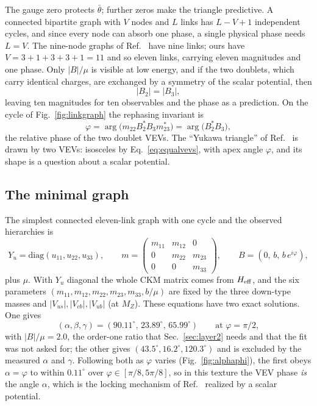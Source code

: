 \documentclass[submission, Phys]{SciPost}
\newcommand{\bt}{\bar\theta}
\begin{document}
The gauge zero protects $\bt$; further zeros make the triangle
predictive. A connected bipartite graph with $V$ nodes and $L$ links
has $L-V+1$ independent cycles, and since every node can absorb one
phase, a single physical phase needs $L=V$. The nine-node graphs of
Ref.~\cite{Arkani-Hamed:2026uos} have nine links; ours have
$V=3+1+3+3+1=11$ and so eleven links, carrying eleven magnitudes and
one phase. Only $|B|/\mu$ is visible at low energy, and if the two
doublets, which carry identical charges, are exchanged by a symmetry
of the scalar potential, then
\begin{equation}
  |B_2|=|B_3|,
  \label{eq:equalvevs}
\end{equation}
leaving ten magnitudes for ten observables and the phase as a
prediction. On the cycle of Fig.~\ref{fig:linkgraph} the rephasing
invariant is
\begin{equation}
  \varphi=\arg\!\big(m_{22}B_2^{*}B_3m_{23}^{*}\big)=\arg\!\big(B_2^{*}B_3\big),
  \label{eq:phivev}
\end{equation}
the relative phase of the two doublet VEVs. The ``Yukawa triangle'' of
Ref.~\cite{Arkani-Hamed:2026uos} is drawn by two VEVs: isosceles by
Eq.~\eqref{eq:equalvevs}, with apex angle $\varphi$, and its shape is a
question about a scalar potential.

\subsection{The minimal graph}
\label{sec:minimalgraph}

The simplest connected eleven-link graph with one cycle and the
observed hierarchies is
\begin{equation}
  Y_u=\mathrm{diag}(u_{11},u_{22},u_{33}),
  \qquad
  m=\begin{pmatrix}
      m_{11}&m_{12}&0\\
      0&m_{22}&m_{23}\\
      0&0&m_{33}
    \end{pmatrix},
  \qquad
  B=(0,\,b,\,b\,e^{i\varphi}),
  \label{eq:minimal}
\end{equation}
plus $\mu$. With $Y_u$ diagonal the whole CKM matrix comes from
$H_{\rm eff}$, and the six parameters
$(m_{11},m_{12},m_{22},m_{23},m_{33},b/\mu)$ are fixed by the three
down-type masses and $|V_{us}|,|V_{cb}|,|V_{ub}|$ (at $M_Z$). These
equations have two exact solutions. One gives
\begin{equation}
  (\alpha,\beta,\gamma)=(90.11^\circ,\,23.89^\circ,\,65.99^\circ)
  \qquad\text{at }\varphi=\pi/2,
  \label{eq:prediction}
\end{equation}
with $|B|/\mu=2.0$, the order-one ratio that Sec.~\ref{sec:layer2}
needs and that the fit was not asked for; the other gives
$(43.5^\circ,16.2^\circ,120.3^\circ)$ and is excluded by the measured
$\alpha$ and $\gamma$. Following both as $\varphi$ varies
(Fig.~\ref{fig:alphaphi}), the first obeys $\alpha=\varphi$ to within
$0.11^\circ$ over $\varphi\in[\pi/8,5\pi/8]$, so in this texture the
VEV phase \emph{is} the angle $\alpha$, which is the locking mechanism of
Ref.~\cite{Arkani-Hamed:2026uos} realized by a scalar potential.
\end{document}
